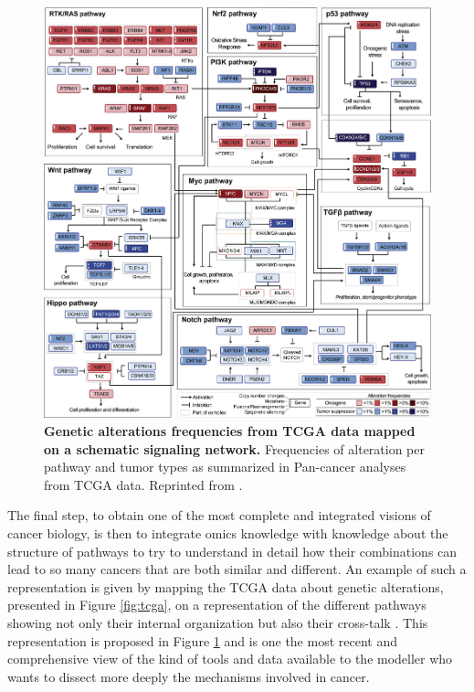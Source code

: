 \documentclass[a4paper,12pt,twoside,onecolumn,openright,final,oldfontcommands]{memoir}
\begin{document}
\begin{figure}

{\centering \includegraphics[width=0.9\linewidth]{fig/pathways} 

}

\caption[Genetic alterations frequencies from TCGA data mapped on a schematic signaling network]{\textbf{Genetic alterations frequencies from TCGA
data mapped on a schematic signaling network.} Frequencies of alteration
per pathway and tumor types as summarized in Pan-cancer analyses from
TCGA data. Reprinted from \citet{sanchez2018oncogenic}.}\label{fig:pathways}
\end{figure}






The final step, to obtain one of the most complete and integrated
visions of cancer biology, is then to integrate omics knowledge with
knowledge about the structure of pathways to try to understand in detail
how their combinations can lead to so many cancers that are both similar
and different. An example of such a representation is given by mapping
the TCGA data about genetic alterations, presented in Figure
\ref{fig:tcga}, on a representation of the different pathways showing
not only their internal organization but also their cross-talk
\citep{sanchez2018oncogenic}. This representation is proposed in Figure
\ref{fig:pathways} and is one the most recent and comprehensive view of
the kind of tools and data available to the modeller who wants to
dissect more deeply the mechanisms involved in cancer.
\end{document}
